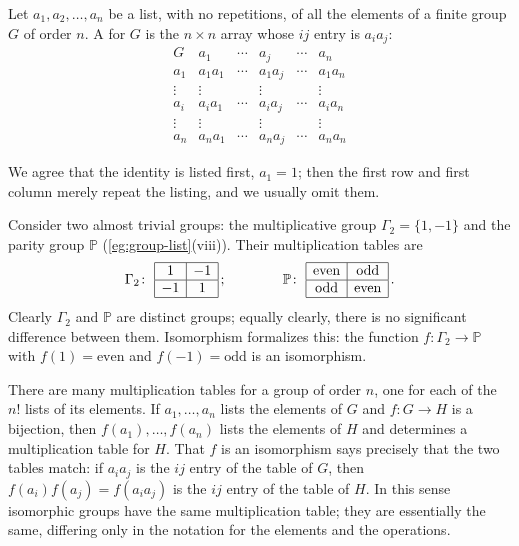 \begin{definition}
	Let \(a_1, a_2, \dots, a_n\) be a list, with no repetitions, of all the elements of a
	finite group \(G\) of order \(n\). A  for \(G\) is the
	\(n \times n\) array whose \(ij\) entry is \(a_ia_j\):
	\[
		\begin{array}{c|ccccc}
			G      & a_1      & \cdots & a_j      & \cdots & a_n      \\ \hline
			a_1    & a_1a_1   & \cdots & a_1a_j   & \cdots & a_1a_n   \\
			\vdots & \vdots   &        & \vdots   &        & \vdots   \\
			a_i    & a_ia_1   & \cdots & a_ia_j   & \cdots & a_ia_n   \\
			\vdots & \vdots   &        & \vdots   &        & \vdots   \\
			a_n    & a_na_1   & \cdots & a_na_j   & \cdots & a_na_n
		\end{array}
	\]
\end{definition}

We agree that the identity is listed first, \(a_1 = 1\); then the first row and first
column merely repeat the listing, and we usually omit them.

Consider two almost trivial groups: the multiplicative group \(\Gamma_2 = \{1, -1\}\) and
the parity group \(\mathbb P\) (\autoref{eg:group-list}(viii)). Their multiplication
tables are
\[
	\Gamma_2\colon\
	\begin{array}{|c|c|}
		\hline
		1  & -1 \\ \hline
		-1 & 1  \\ \hline
	\end{array}\,;
	\qquad\qquad
	\mathbb P\colon\
	\begin{array}{|c|c|}
		\hline
		\text{even} & \text{odd}  \\ \hline
		\text{odd}  & \text{even} \\ \hline
	\end{array}\,.
\]
Clearly \(\Gamma_2\) and \(\mathbb P\) are distinct groups; equally clearly, there is no
significant difference between them. Isomorphism formalizes this: the function
\(f\colon \Gamma_2 \to \mathbb P\) with \(f(1) = \text{even}\) and
\(f(-1) = \text{odd}\) is an isomorphism.

There are many multiplication tables for a group of order \(n\), one for each of the
\(n!\) lists of its elements. If \(a_1, \dots, a_n\) lists the elements of \(G\) and
\(f\colon G \to H\) is a bijection, then \(f(a_1), \dots, f(a_n)\) lists the elements of
\(H\) and determines a multiplication table for \(H\). That \(f\) is an isomorphism says
precisely that the two tables match: if \(a_ia_j\) is the \(ij\) entry of the table of
\(G\), then \(f(a_i)f(a_j) = f(a_ia_j)\) is the \(ij\) entry of the table of \(H\). In
this sense isomorphic groups have the same multiplication table; they are essentially the
same, differing only in the notation for the elements and the operations.

